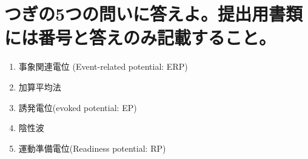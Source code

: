 \documentclass[titlepage,a4paper]{jsarticle}
\begin{document}
\section{つぎの5つの問いに答えよ。提出用書類には番号と答えのみ記載すること。}%
\begin{enumerate}
  \item 事象関連電位 (Event-related potential: ERP)
  \item 加算平均法
  \item 誘発電位(evoked potential: EP)
  \item 陰性波
  \item 運動準備電位(Readiness potential: RP)
\end{enumerate}
\end{document}
